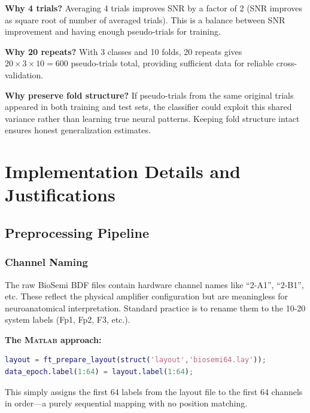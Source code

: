 \documentclass[11pt,a4paper]{article}
\newcommand{\matlab}{\textsc{Matlab}}
\begin{document}
\textbf{Why 4 trials?}
Averaging 4 trials improves SNR by a factor of 2 (SNR improves as square root of number of averaged trials). This is a balance between SNR improvement and having enough pseudo-trials for training.

\textbf{Why 20 repeats?}
With 3 classes and 10 folds, 20 repeats gives $20 \times 3 \times 10 = 600$ pseudo-trials total, providing sufficient data for reliable cross-validation.

\textbf{Why preserve fold structure?}
If pseudo-trials from the same original trials appeared in both training and test sets, the classifier could exploit this shared variance rather than learning true neural patterns. Keeping fold structure intact ensures honest generalization estimates.


\section{Implementation Details and Justifications}
\label{sec:implementation}

\subsection{Preprocessing Pipeline}
\label{subsec:preprocessing}

\subsubsection{Channel Naming}

The raw BioSemi BDF files contain hardware channel names like ``2-A1'', ``2-B1'', etc. These reflect the physical amplifier configuration but are meaningless for neuroanatomical interpretation. Standard practice is to rename them to the 10-20 system labels (Fp1, Fp2, F3, etc.).

\textbf{The \matlab{} approach:}
\begin{lstlisting}[style=matlabstyle,language=Matlab]
layout = ft_prepare_layout(struct('layout','biosemi64.lay'));
data_epoch.label(1:64) = layout.label(1:64);
\end{lstlisting}

This simply assigns the first 64 labels from the layout file to the first 64 channels in order---a purely sequential mapping with no position matching.
\end{document}
